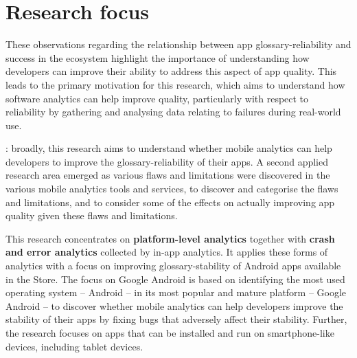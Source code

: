\section{Research focus}
These observations regarding the relationship between app \gls{glossary-reliability} and success in the ecosystem highlight the importance of understanding how developers can improve their ability to address this aspect of app quality. This leads to the primary motivation for this research, which aims to understand how software analytics can help improve quality, particularly with respect to reliability by gathering and analysing data relating to failures during real-world use.

: broadly, this research aims to understand whether mobile analytics can help developers to improve the \gls{glossary-reliability} of their apps. A second applied research area emerged as various flaws and limitations were discovered in the various mobile analytics tools and services, to discover and categorise the flaws and limitations, and to consider some of the effects on actually improving app quality given these flaws and limitations.

This research concentrates on \textbf{platform-level analytics} together with \textbf{crash and error analytics} collected by in-app analytics. It applies these forms of analytics with a focus on improving \gls{glossary-stability} of Android apps available in the  Store. The focus on Google Android is based on identifying the most used operating system -- Android -- in its most popular and mature platform -- Google Android -- to discover whether mobile analytics can help developers improve the stability of their apps by fixing bugs that adversely affect their stability. Further, the research focuses on apps that can be installed and run on smartphone-like devices, including tablet devices.

